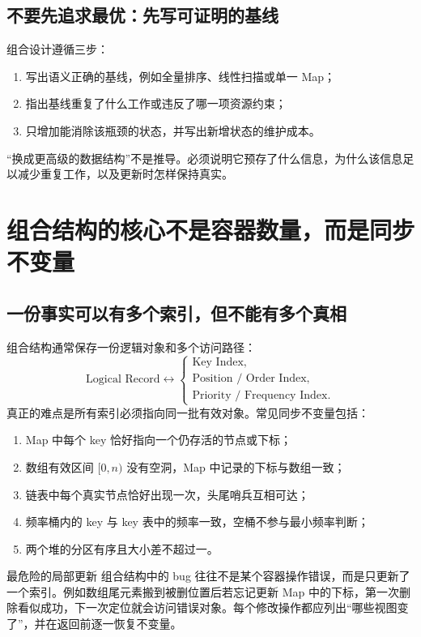\documentclass[UTF8,fontset=none,11pt,a4paper]{ctexart}
\begin{document}
\subsection{不要先追求最优：先写可证明的基线}
组合设计遵循三步：
\begin{enumerate}
  \item 写出语义正确的基线，例如全量排序、线性扫描或单一 Map；
  \item 指出基线重复了什么工作或违反了哪一项资源约束；
  \item 只增加能消除该瓶颈的状态，并写出新增状态的维护成本。
\end{enumerate}
“换成更高级的数据结构”不是推导。必须说明它预存了什么信息，为什么该信息足以减少重复工作，以及更新时怎样保持真实。

\section{组合结构的核心不是容器数量，而是同步不变量}

\subsection{一份事实可以有多个索引，但不能有多个真相}
组合结构通常保存一份逻辑对象和多个访问路径：
\[
\text{Logical Record}
\longleftrightarrow
\begin{cases}
\text{Key Index},\\
\text{Position / Order Index},\\
\text{Priority / Frequency Index}.
\end{cases}
\]
真正的难点是所有索引必须指向同一批有效对象。常见同步不变量包括：
\begin{enumerate}
  \item Map 中每个 key 恰好指向一个仍存活的节点或下标；
  \item 数组有效区间 $[0,n)$ 没有空洞，Map 中记录的下标与数组一致；
  \item 链表中每个真实节点恰好出现一次，头尾哨兵互相可达；
  \item 频率桶内的 key 与 key 表中的频率一致，空桶不参与最小频率判断；
  \item 两个堆的分区有序且大小差不超过一。
\end{enumerate}

\begin{warnbox}{最危险的局部更新}
组合结构中的 bug 往往不是某个容器操作错误，而是只更新了一个索引。例如数组尾元素搬到被删位置后若忘记更新 Map 中的下标，第一次删除看似成功，下一次定位就会访问错误对象。每个修改操作都应列出“哪些视图变了”，并在返回前逐一恢复不变量。
\end{warnbox}
\end{document}
